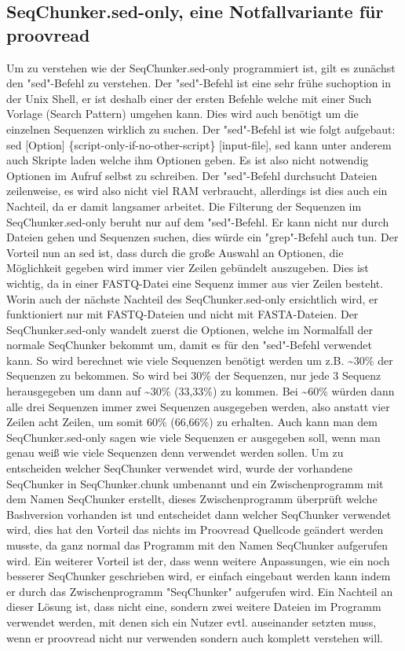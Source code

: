 \documentclass{scrartcl}
\begin{document}
\subsection{SeqChunker.sed-only, eine Notfallvariante für proovread}
\label{sec-5-3}
Um zu verstehen wie der SeqChunker.sed-only programmiert ist, gilt es zunächst den "sed"-Befehl zu verstehen. Der "sed"-Befehl ist eine 
sehr frühe suchoption in der Unix Shell, er ist deshalb einer der ersten Befehle welche mit einer Such Vorlage (Search Pattern) umgehen kann.
Dies wird auch benötigt um die einzelnen Sequenzen wirklich zu suchen. Der "sed"-Befehl ist wie folgt aufgebaut:
sed [Option] \{script-only-if-no-other-script\} [input-file], sed kann unter anderem auch Skripte laden welche ihm Optionen geben. Es 
ist also nicht notwendig Optionen im Aufruf selbst zu schreiben. Der "sed"-Befehl durchsucht Dateien zeilenweise, es wird 
also nicht viel RAM verbraucht, allerdings ist dies auch ein Nachteil, da er damit langsamer arbeitet. 
Die Filterung der Sequenzen im SeqChunker.sed-only beruht nur auf dem "sed"-Befehl. Er kann nicht nur durch Dateien gehen und Sequenzen
suchen, dies würde ein "grep"-Befehl auch tun. Der Vorteil nun an sed ist, dass durch die große Auswahl an Optionen, die Möglichkeit gegeben wird
immer vier Zeilen gebündelt auszugeben. Dies ist wichtig, da in einer FASTQ-Datei eine Sequenz immer aus vier Zeilen besteht. Worin auch der 
nächste Nachteil des SeqChunker.sed-only ersichtlich wird, er funktioniert nur mit FASTQ-Dateien und nicht mit 
FASTA-Dateien. Der SeqChunker.sed-only wandelt zuerst die Optionen, welche im Normalfall der normale SeqChunker bekommt um, damit es für 
den "sed"-Befehl verwendet kann. So wird berechnet wie viele Sequenzen benötigt werden um z.B. \textasciitilde{}30\% der Sequenzen zu bekommen.
So wird bei 30\% der Sequenzen, nur jede 3 Sequenz herausgegeben um dann auf \textasciitilde{}30\% (33,33\%) zu kommen. Bei \textasciitilde{}60\% würden dann
alle drei Sequenzen immer zwei Sequenzen ausgegeben werden, also anstatt vier Zeilen acht Zeilen, um somit 60\% (66,66\%) zu erhalten.
Auch kann man dem SeqChunker.sed-only sagen wie viele Sequenzen er ausgegeben soll, wenn man genau weiß wie viele Sequenzen denn verwendet 
werden sollen. 
Um zu entscheiden welcher SeqChunker verwendet wird, wurde der vorhandene SeqChunker in SeqChunker.chunk umbenannt und ein Zwischenprogramm
mit dem Namen SeqChunker erstellt, dieses Zwischenprogramm überprüft welche Bashversion vorhanden ist und entscheidet dann welcher SeqChunker 
verwendet wird, dies hat den Vorteil das nichts im Proovread Quellcode geändert werden musste, da ganz normal das Programm mit den Namen
SeqChunker aufgerufen wird. Ein weiterer Vorteil ist der, dass wenn weitere Anpassungen, wie ein noch besserer SeqChunker geschrieben wird, er einfach
eingebaut werden kann indem er durch das Zwischenprogramm "SeqChunker" aufgerufen wird. Ein Nachteil an dieser Lösung ist, dass nicht eine, sondern zwei 
weitere Dateien im Programm verwendet werden, mit denen sich ein Nutzer evtl. auseinander setzten muss, wenn er proovread nicht nur verwenden sondern auch
komplett verstehen will.
\end{document}
